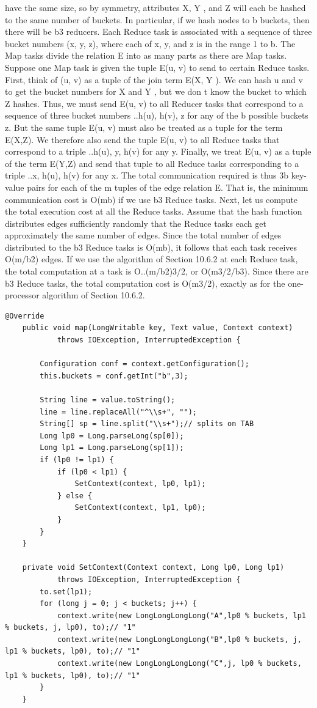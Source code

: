 \documentclass[paper=a4, fontsize=11pt]{scrartcl}	%
\numberwithin{equation}{section}															%
\numberwithin{figure}{section}																%
\numberwithin{table}{section}																%
\begin{document}
have the same size, so by symmetry, attributes X, Y , and Z will each be hashed
to the same number of buckets. In particular, if we hash nodes to b buckets,
then there will be b3 reducers. Each Reduce task is associated with a sequence
of three bucket numbers (x, y, z), where each of x, y, and z is in the range 1 to
b.
The Map tasks divide the relation E into as many parts as there are Map
tasks. Suppose one Map task is given the tuple E(u, v) to send to certain
Reduce tasks. First, think of (u, v) as a tuple of the join term E(X, Y ). We
can hash u and v to get the bucket numbers for X and Y , but we don t know
the bucket to which Z hashes. Thus, we must send E(u, v) to all Reducer tasks
that correspond to a sequence of three bucket numbers ..h(u), h(v), z for any
of the b possible buckets z.
But the same tuple E(u, v) must also be treated as a tuple for the term
E(X,Z). We therefore also send the tuple E(u, v) to all Reduce tasks that
correspond to a triple ..h(u), y, h(v) for any y. Finally, we treat E(u, v) as a
tuple of the term E(Y,Z) and send that tuple to all Reduce tasks corresponding
to a triple ..x, h(u), h(v) for any x. The total communication required is thus
3b key-value pairs for each of the m tuples of the edge relation E. That is, the
minimum communication cost is O(mb) if we use b3 Reduce tasks.
Next, let us compute the total execution cost at all the Reduce tasks. Assume
that the hash function distributes edges sufficiently randomly that the
Reduce tasks each get approximately the same number of edges. Since the total
number of edges distributed to the b3 Reduce tasks is O(mb), it follows that each
task receives O(m/b2) edges. If we use the algorithm of Section 10.6.2 at each
Reduce task, the total computation at a task is O..(m/b2)3/2, or O(m3/2/b3).
Since there are b3 Reduce tasks, the total computation cost is O(m3/2), exactly
as for the one-processor algorithm of Section 10.6.2.\\
\begin{lstlisting}[label=Mapper,caption=Implementazione del Mapper single Job]
	@Override
	public void map(LongWritable key, Text value, Context context)
			throws IOException, InterruptedException {

		Configuration conf = context.getConfiguration();
		this.buckets = conf.getInt("b",3);
		
		String line = value.toString();
		line = line.replaceAll("^\\s+", "");
		String[] sp = line.split("\\s+");// splits on TAB
		Long lp0 = Long.parseLong(sp[0]);
		Long lp1 = Long.parseLong(sp[1]);
		if (lp0 != lp1) {
			if (lp0 < lp1) {
				SetContext(context, lp0, lp1);
			} else {
				SetContext(context, lp1, lp0);
			}
		}
	}

	private void SetContext(Context context, Long lp0, Long lp1)
			throws IOException, InterruptedException {
		to.set(lp1);
		for (long j = 0; j < buckets; j++) {
			context.write(new LongLongLongLong("A",lp0 % buckets, lp1 % buckets, j, lp0), to);// "1"
			context.write(new LongLongLongLong("B",lp0 % buckets, j, lp1 % buckets, lp0), to);// "1"
			context.write(new LongLongLongLong("C",j, lp0 % buckets, lp1 % buckets, lp0), to);// "1"
		}
	}
\end{lstlisting}
\end{document}

